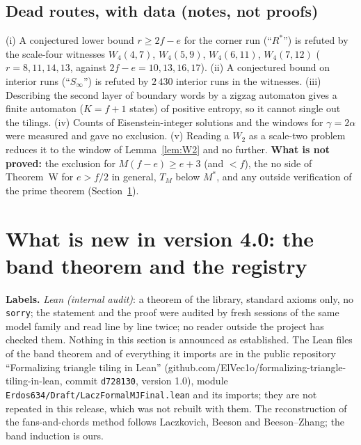 \documentclass[11pt,reqno]{amsart}
\theoremstyle{plain}
\theoremstyle{definition}
\begin{document}
\subsection*{Dead routes, with data (notes, not proofs)}
(i) A conjectured lower bound $r\ge 2f-e$ for the corner run (``$R^*$'') is refuted by the scale-four witnesses $W_4(4,7)$, $W_4(5,9)$, $W_4(6,11)$, $W_4(7,12)$ ($r=8,11,14,13$, against $2f-e=10,13,16,17$). (ii) A conjectured bound on interior runs (``$S_\infty$'') is refuted by $2\,430$ interior runs in the witnesses. (iii) Describing the second layer of boundary words by a zigzag automaton gives a finite automaton ($K=f+1$ states) of positive entropy, so it cannot single out the tilings. (iv) Counts of Eisenstein-integer solutions and the windows for $\gamma=2\alpha$ were measured and gave no exclusion. (v) Reading a $W_2$ as a scale-two problem reduces it to the window of Lemma~\ref{lem:W2} and no further.
\textbf{What is not proved:} the exclusion for $M(f-e)\ge e+3$ (and $<f$), the no side of Theorem~W for $e>f/2$ in general, $T_M$ below $M^*$, and any outside verification of the prime theorem (Section~\ref{sec:v40}).


\section{What is new in version 4.0: the band theorem and the registry}\label{sec:v40}
\textbf{Labels.} \emph{Lean (internal audit)}: a theorem of the library, standard axioms only, no \texttt{sorry}; the statement and the proof were audited by fresh sessions of the same model family and read line by line twice; no reader outside the project has checked them. Nothing in this section is announced as established. The Lean files of the band theorem and of everything it imports are in the public repository ``Formalizing triangle tiling in Lean'' (github.com/ElVec1o/formalizing-triangle-tiling-in-lean, commit \texttt{d728130}, version 1.0), module \texttt{Erdos634/Draft/LaczFormalMJFinal.lean} and its imports; they are not repeated in this release, which was not rebuilt with them. The reconstruction of the fans-and-chords method follows Laczkovich, Beeson and Beeson--Zhang; the band induction is ours.
\end{document}
